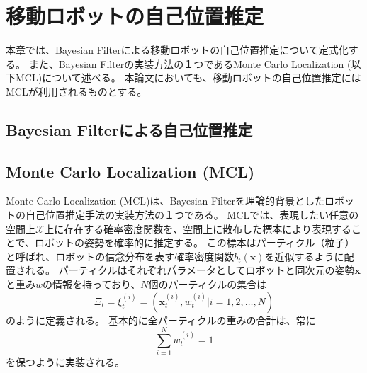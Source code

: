 \chapter{移動ロボットの自己位置推定} \label{chapter:localization}

本章では、Bayesian Filterによる移動ロボットの自己位置推定について定式化する。
また、Bayesian Filterの実装方法の１つであるMonte Carlo Localization (以下MCL)について述べる。
本論文においても、移動ロボットの自己位置推定にはMCLが利用されるものとする。



\section{Bayesian Filterによる自己位置推定}




\section{Monte Carlo Localization (MCL)}

Monte Carlo Localization (MCL)は、Bayesian Filterを理論的背景としたロボットの自己位置推定手法の実装方法の１つである。
MCLでは、表現したい任意の空間上$\mathcal{X}$上に存在する確率密度関数を、空間上に散布した標本により表現することで、ロボットの姿勢を確率的に推定する。
この標本はパーティクル（粒子）と呼ばれ、ロボットの信念分布を表す確率密度関数$b_t(\bm{x})$を近似するように配置される。
パーティクルはそれぞれパラメータとしてロボットと同次元の姿勢$\bm{x}$と重み$w$の情報を持っており、$N$個のパーティクルの集合は
\begin{equation}
\label{particles}
  \Xi_{t} = {\xi^{(i)}_{t} = (\bm{x}^{(i)}_{t}, w^{(i)}_{t} |i = 1,2,\dots,N) }
\end{equation}
のように定義される。
基本的に全パーティクルの重みの合計は、常に
\begin{equation}
\label{weight_sum}
  \sum_{i=1}^{N}w^{(i)}_{t}=1
\end{equation}
を保つように実装される。

